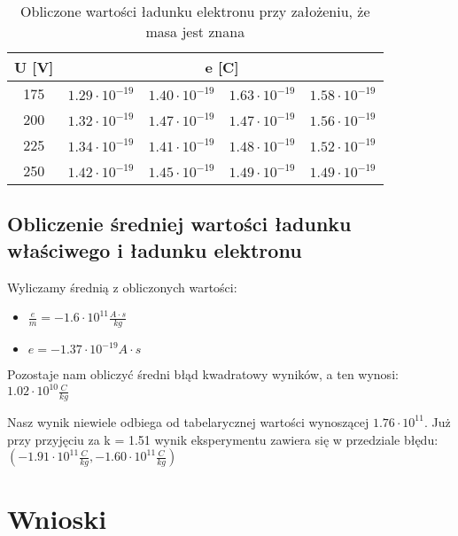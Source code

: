 \documentclass{article}
\begin{document}
\begin{table}[htbp]
\centering
\begin{tabular}{|c|r|r|r|r|}
\hline
U [V] & \multicolumn{4}{|c|}{e [C]} \\ \hline
175 & $1.29 \cdot 10^{-19}$ & $1.40 \cdot 10^{-19}$ & $1.63 \cdot 10^{-19}$ & $1.58 \cdot 10^{-19}$ \\ \hline
200 & $1.32 \cdot 10^{-19}$ &$1.47 \cdot 10^{-19}$ & $1.47 \cdot 10^{-19}$ & $1.56 \cdot 10^{-19}$ \\ \hline
225 & $1.34 \cdot 10^{-19}$ & $1.41 \cdot 10^{-19}$ & $1.48 \cdot 10^{-19}$ & $1.52 \cdot 10^{-19}$ \\ \hline
250 & $1.42 \cdot 10^{-19}$ & $1.45 \cdot 10^{-19}$ & $1.49 \cdot 10^{-19}$ & $1.49 \cdot 10^{-19}$ \\ \hline
\end{tabular}
\caption{Obliczone wartości ładunku elektronu przy założeniu, że masa jest znana}
\label{}
\end{table}

\subsection{Obliczenie średniej wartości ładunku właściwego i ładunku elektronu}

Wyliczamy średnią z obliczonych wartości:
\begin{itemize}
\item $\frac{e}{m} = -1.6 \cdot 10^{11} \frac{A \cdot s}{kg}$
\item $e = -1.37 \cdot 10^{-19} A \cdot s$
\end{itemize}

Pozostaje nam obliczyć średni błąd kwadratowy wyników, a ten wynosi: $1.02 \cdot 10^{10} \frac{C}{kg}$

Nasz wynik niewiele odbiega od tabelarycznej wartości wynoszącej $1.76 \cdot 10^{11}$. Już przy przyjęciu za k = 1.51 wynik eksperymentu zawiera się w przedziale błędu: $(-1.91 \cdot 10^{11} \frac{C}{kg}, -1.60 \cdot 10^{11} \frac{C}{kg})$

\section{Wnioski}






\end{document}
